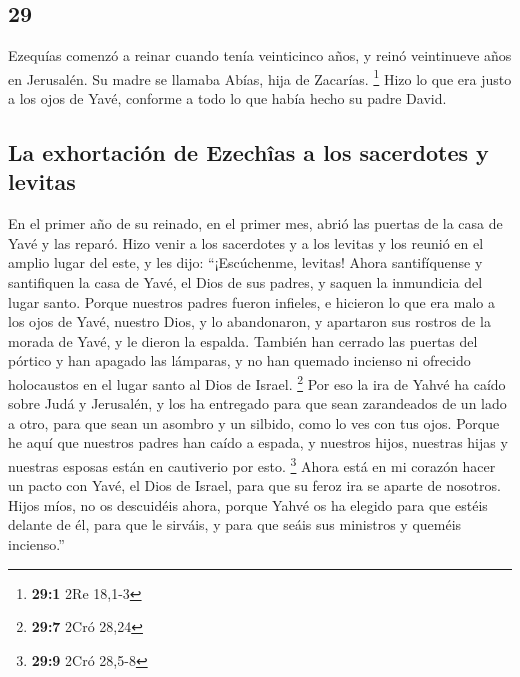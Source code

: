\begin{paracol}{2}
\hypertarget{section-56}{%
\section{29}\label{section-56}}

 Ezequías comenzó a reinar cuando tenía veinticinco años,
y reinó veintinueve años en Jerusalén. Su madre se llamaba Abías, hija
de Zacarías. \footnote{\textbf{29:1} 2Re 18,1-3}  Hizo lo
que era justo a los ojos de Yavé, conforme a todo lo que había hecho su
padre David.

\hypertarget{la-exhortaciuxf3n-de-ezechuxeeas-a-los-sacerdotes-y-levitas}{%
\subsection{La exhortación de Ezechîas a los sacerdotes y
levitas}\label{la-exhortaciuxf3n-de-ezechuxeeas-a-los-sacerdotes-y-levitas}}

 En el primer año de su reinado, en el primer mes, abrió
las puertas de la casa de Yavé y las reparó.  Hizo venir a
los sacerdotes y a los levitas y los reunió en el amplio lugar del este,
 y les dijo: ``¡Escúchenme, levitas! Ahora santifíquense y
santifiquen la casa de Yavé, el Dios de sus padres, y saquen la
inmundicia del lugar santo.  Porque nuestros padres fueron
infieles, e hicieron lo que era malo a los ojos de Yavé, nuestro Dios, y
lo abandonaron, y apartaron sus rostros de la morada de Yavé, y le
dieron la espalda.  También han cerrado las puertas del
pórtico y han apagado las lámparas, y no han quemado incienso ni
ofrecido holocaustos en el lugar santo al Dios de Israel. \footnote{\textbf{29:7}
  2Cró 28,24}  Por eso la ira de Yahvé ha caído sobre Judá
y Jerusalén, y los ha entregado para que sean zarandeados de un lado a
otro, para que sean un asombro y un silbido, como lo ves con tus ojos.
 Porque he aquí que nuestros padres han caído a espada, y
nuestros hijos, nuestras hijas y nuestras esposas están en cautiverio
por esto. \footnote{\textbf{29:9} 2Cró 28,5-8}  Ahora
está en mi corazón hacer un pacto con Yavé, el Dios de Israel, para que
su feroz ira se aparte de nosotros.  Hijos míos, no os
descuidéis ahora, porque Yahvé os ha elegido para que estéis delante de
él, para que le sirváis, y para que seáis sus ministros y queméis
incienso.''

\hypertarget{purificaciuxf3n-del-templo-por-los-levitas}{%
}
\end{paracol}
